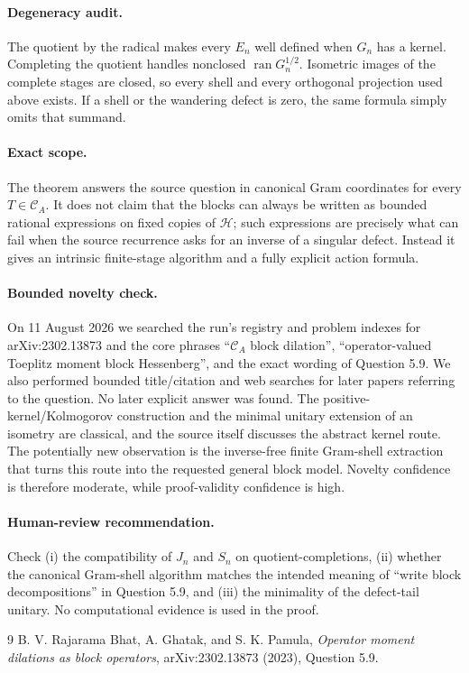 \documentclass[11pt]{article}
\newcommand{\Hh}{\mathcal H}
\newcommand{\ran}{\operatorname{ran}}
\begin{document}
\paragraph{Degeneracy audit.}
The quotient by the radical makes every $E_n$ well defined when $G_n$ has a
kernel.  Completing the quotient handles nonclosed $\ran G_n^{1/2}$.
Isometric images of the complete stages are closed, so every shell and every
orthogonal projection used above exists.  If a shell or the wandering defect
is zero, the same formula simply omits that summand.

\paragraph{Exact scope.}
The theorem answers the source question in canonical Gram coordinates for
every $T\in\mathcal C_A$.  It does not claim that the blocks can always be
written as bounded rational expressions on fixed copies of $\Hh$; such
expressions are precisely what can fail when the source recurrence asks for
an inverse of a singular defect.  Instead it gives an intrinsic finite-stage
algorithm and a fully explicit action formula.

\paragraph{Bounded novelty check.}
On 11 August 2026 we searched the run's registry and problem indexes for
arXiv:2302.13873 and the core phrases ``$\mathcal C_A$ block dilation'',
``operator-valued Toeplitz moment block Hessenberg'', and the exact wording of
Question 5.9.  We also performed bounded title/citation and web searches for
later papers referring to the question.  No later explicit answer was found.
The positive-kernel/Kolmogorov construction and the minimal unitary extension
of an isometry are classical, and the source itself discusses the abstract
kernel route.  The potentially new observation is the inverse-free finite
Gram-shell extraction that turns this route into the requested general block
model.  Novelty confidence is therefore moderate, while proof-validity
confidence is high.

\paragraph{Human-review recommendation.}
Check (i) the compatibility of $J_n$ and $S_n$ on quotient-completions,
(ii) whether the canonical Gram-shell algorithm matches the intended meaning
of ``write block decompositions'' in Question 5.9, and (iii) the minimality of
the defect-tail unitary.  No computational evidence is used in the proof.

\begin{thebibliography}{9}
B. V. Rajarama Bhat, A. Ghatak, and S. K. Pamula,
\emph{Operator moment dilations as block operators},
arXiv:2302.13873 (2023), Question 5.9.
\end{thebibliography}
\end{document}
